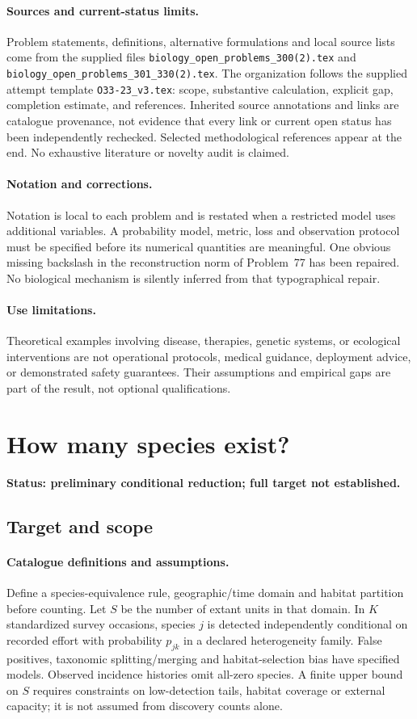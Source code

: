 \documentclass[11pt]{article}
\begin{document}
\paragraph{Sources and current-status limits.}
Problem statements, definitions, alternative formulations and local source lists
come from the supplied files
\texttt{biology\_open\_problems\_300(2).tex} and
\texttt{biology\_open\_problems\_301\_330(2).tex}.
The organization follows the supplied attempt template
\texttt{O33-23\_v3.tex}: scope, substantive calculation, explicit gap,
completion estimate, and references. Inherited source annotations and links are
catalogue provenance, not evidence that every link or current open status has
been independently rechecked. Selected methodological references appear at the
end. No exhaustive literature or novelty audit is claimed.

\paragraph{Notation and corrections.}
Notation is local to each problem and is restated when a restricted model uses
additional variables. A probability model, metric, loss and observation protocol
must be specified before its numerical quantities are meaningful. One obvious
missing backslash in the reconstruction norm of Problem~77 has been repaired.
No biological mechanism is silently inferred from that typographical repair.

\paragraph{Use limitations.}
Theoretical examples involving disease, therapies, genetic systems, or ecological
interventions are not operational protocols, medical guidance, deployment advice,
or demonstrated safety guarantees. Their assumptions and empirical gaps are part
of the result, not optional qualifications.


\section*{How many species exist?}
\label{prob:314}
\noindent\textbf{Status: preliminary conditional reduction; full target not established.}
\subsection{Target and scope}
\paragraph{Catalogue definitions and assumptions.}
Define a species-equivalence rule, geographic/time domain and habitat partition before counting. Let $S$ be the number of extant units in that domain. In $K$ standardized survey occasions, species $j$ is detected independently conditional on recorded effort with probability $p_{jk}$ in a declared heterogeneity family. False positives, taxonomic splitting/merging and habitat-selection bias have specified models. Observed incidence histories omit all-zero species. A finite upper bound on $S$ requires constraints on low-detection tails, habitat coverage or external capacity; it is not assumed from discovery counts alone.
\end{document}
